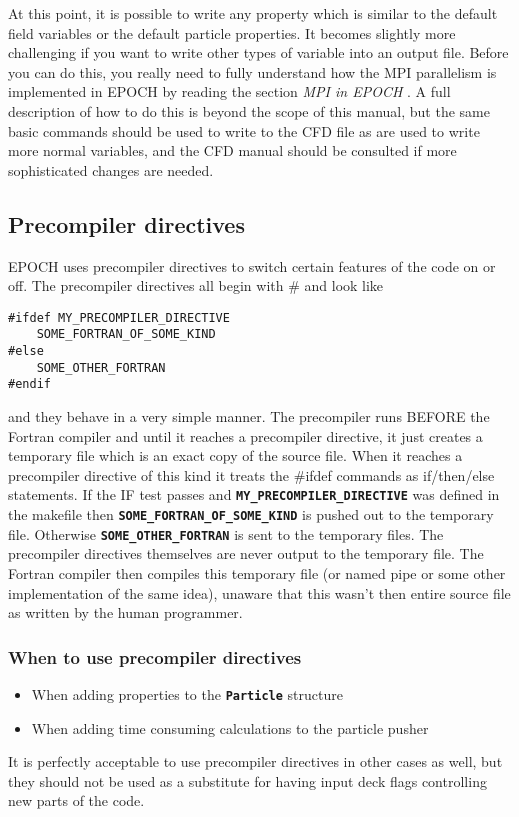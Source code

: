 \documentclass[12pt]{article}
\newcommand{\simpleboxverbatim}{\begin{Verbatim}[obeytabs=true,frame=single,
  framerule=0.5mm,rulecolor=\color{warwickmid}]}
\newcommand{\inlinecode}[1]{{\color{warwickred} \bf\texttt{#1}}}
\newcommand{\EPOCH}{{\color{warwickdark}\fontfamily{phv}\selectfont EPOCH} }
\begin{document}
At this point, it is possible to write any property which is similar to the
default field variables or the default particle properties. It becomes slightly
more challenging if you want to write other types of variable into an output
file. Before you can do this, you really need to fully understand how the MPI
parallelism is implemented in \EPOCH by reading the section {\it MPI in
\EPOCH}. A full description of how to do this is beyond the scope of this
manual, but the same basic commands should be used to write to the CFD file as
are used to write more normal variables, and the CFD manual should be consulted
if more sophisticated changes are needed.

\pagebreak

\subsection{Precompiler directives}
\EPOCH uses precompiler directives to switch certain features of the code on or
off. The precompiler directives all begin with \# and look like
\simpleboxverbatim
#ifdef MY_PRECOMPILER_DIRECTIVE
	SOME_FORTRAN_OF_SOME_KIND
#else
	SOME_OTHER_FORTRAN
#endif
\end{Verbatim}
and they behave in a very simple manner. The precompiler runs BEFORE the
Fortran compiler and until it reaches a precompiler directive, it just creates
a temporary file which is an exact copy of the source file. When it reaches a
precompiler directive of this kind it treats the \#ifdef commands as
if/then/else statements. If the IF test passes and
\inlinecode{MY\_PRECOMPILER\_DIRECTIVE} was defined in the makefile then
\inlinecode{SOME\_FORTRAN\_OF\_SOME\_KIND} is pushed out to the temporary
file. Otherwise \inlinecode{SOME\_OTHER\_FORTRAN} is sent to the temporary
files. The precompiler directives themselves are never output to the temporary
file. The Fortran compiler then compiles this temporary file (or named pipe or
some other implementation of the same idea), unaware that this wasn't then
entire source file as written by the human programmer.

\subsubsection{When to use precompiler directives}
\begin{itemize}
\item When adding properties to the \inlinecode{Particle} structure
\item When adding time consuming calculations to the particle pusher
\end{itemize}
It is perfectly acceptable to use precompiler directives in other cases as
well, but they should not be used as a substitute for having input deck flags
controlling new parts of the code.
\end{document}

